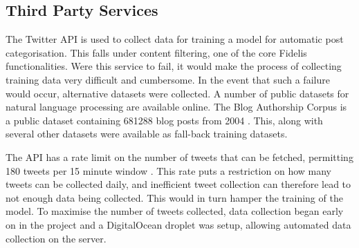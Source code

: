 \subsection{Third Party Services}
The Twitter API is used to collect data for training a model for automatic post categorisation. This falls under content filtering, one of the core Fidelis functionalities. Were this service to fail, it would make the process of collecting training data very difficult and cumbersome. In the event that such a failure would occur, alternative datasets were collected. A number of public datasets for natural language processing are available online. The Blog Authorship Corpus is a public dataset containing 681288 blog posts from 2004 \cite{dataset:blogs}. This, along with several other datasets \cite{dataset:all} were available as fall-back training datasets.

The API has a rate limit on the number of tweets that can be fetched, permitting 180 tweets per 15 minute window \cite{twitter-api:rates}. This rate puts a restriction on how many tweets can be collected daily, and inefficient tweet collection can therefore lead to not enough data being collected. This would in turn hamper the training of the model. To maximise the number of tweets collected, data collection began early on in the project and a DigitalOcean droplet was setup, allowing automated data collection on the server.
